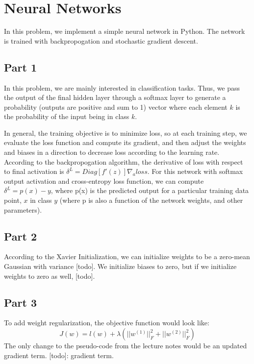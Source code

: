 \section{Neural Networks} \label{sec:prob1}
In this problem, we implement a simple neural network in Python.
The network is trained with backpropogation and stochastic gradient descent.

\subsection{Part 1}
In this problem, we are mainly interested in classification tasks.
Thus, we pass the output of the final hidden layer through a softmax layer to generate a probability (outputs are positive and sum to 1) vector where each element $k$ is the probability of the input being in class $k$.

In general, the training objective is to minimize loss, so at each training step, we evaluate the loss function and compute its gradient, and then adjust the weights and biases in a direction to decrease loss according to the learning rate.
According to the backpropogation algorithm, the derivative of loss with respect to final activation is $\delta^L = Diag[f'(z)] \nabla_a loss$.
For this network with softmax output activation and cross-entropy loss function, we can compute $\delta^L = p(x) - y$, where p(x) is the predicted output for a particular training data point, $x$ in class $y$ (where p is also a function of the network weights, and other parameters).


\subsection{Part 2}
According to the Xavier Initialization, we can initialize weights to be a zero-mean Gaussian with variance [todo].
We initialize biases to zero, but if we initialize weights to zero as well, [todo].

\subsection{Part 3}
To add weight regularization, the objective function would look like:
\begin{equation}
J(w) = l(w) + \lambda(||w^{(1)}||^2_F + ||w^{(2)}||^2_F)
\end{equation}
The only change to the pseudo-code from the lecture notes would be an updated gradient term.
[todo]: gradient term.





